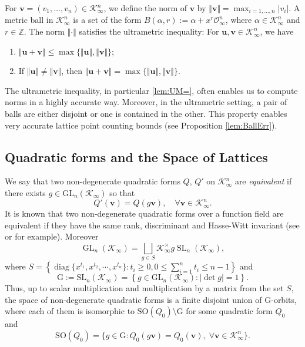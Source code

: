 \documentclass[11pt,a4paper,reqno]{amsart}
\newcommand{\GL}{\mathrm{GL}}
\newcommand{\SL}{\mathrm{SL}}
\newcommand{\SO}{{\mathrm{SO}}}
\theoremstyle{definition}
\theoremstyle{remark}
\numberwithin{equation}{section}
\begin{document}
 For $\mathbf{v}=(v_1,\dots,v_n)\in \mathcal{K}_{\infty}^n$, we define the norm of $\mathbf{v}$ by $\Vert \mathbf{v}\Vert=\max_{i=1,\dots,n}\vert v_i\vert$. A metric ball in $\mathcal K_\infty^n$ is a set of the form $B(\alpha,r):=\alpha+x^r\mathcal{O}_{\infty}^n$, where $\alpha\in \mathcal{K}_{\infty}^n$ and $r\in \mathbb Z$. The norm $\Vert \cdot \Vert$ satisfies the ultrametric inequality: For $\mathbf{u},\mathbf{v}\in \mathcal{K}_{\infty}^n$, we have
    \begin{enumerate}
        \item \label{lem:UM} $\Vert \mathbf{u}+\mathbf{v}\Vert\leq \max\{\Vert \mathbf{u}\Vert,\Vert\mathbf{v}\Vert\}$;
        \item \label{lem:UM=} If $\Vert \mathbf{u}\Vert\neq \Vert \mathbf{v}\Vert$, then $\Vert \mathbf{u}+\mathbf{v}\Vert=\max\{\Vert \mathbf{u}\Vert,\Vert \mathbf{v}\Vert\}$.
    \end{enumerate}

The ultrametric inequality, in particular \eqref{lem:UM=}, often enables us to compute norms in a highly accurate way. Moreover, in the ultrametric setting, a pair of balls are either disjoint or one is contained in the other. This property enables very accurate lattice point counting bounds (see Proposition \ref{lem:BallErr}). 

\subsection{Quadratic forms and the Space of Lattices} 
We say that two non-degenerate quadratic forms $Q$, $Q'$ on $\mathcal K_\infty^n$ are \emph{equivalent} if there exists $g\in \GL_n(\mathcal K_\infty)$ so that
\[
Q'(\mathbf{v})= Q(g\mathbf v),\quad \forall \mathbf v\in \mathcal K_\infty^n.
\] 
It is known that two non-degenerate quadratic forms over a function field are equivalent if they have the same rank, discriminant and Hasse-Witt invariant (see \cite[Remark 5.12]{EKM} or \cite[V.3.17]{Lam} for example). Moreover $$\operatorname{GL}_n(\mathcal{K}_{\infty})=\bigsqcup_{g\in S}\mathcal{K}_{\infty}^\times g \operatorname{SL}_n(\mathcal{K}_{\infty}),$$
where $S=\left\{\operatorname{diag}\{x^{t_1},x^{t_2},\cdots,x^{t_n}\}:t_i\geq 0,0\leq \sum_{i=1}^nt_i\leq n-1\right\}$ and $$\mathrm{G}:=\SL_n(\mathcal K_\infty)=\left\{g\in \GL_n(\mathcal K_\infty): |\det g|=1\right\}.$$
Thus, up to scalar multiplication and multiplication by a matrix from the set $S$, the space of non-degenerate quadratic forms is a finite disjoint union of $\mathrm{G}$-orbits, where each of them is isomorphic to $\SO(Q_0)\setminus \mathrm{G}$ for some quadratic form $Q_0$ and $$\SO(Q_0)=\{g\in \mathrm{G}: Q_0(g\mathbf v)=Q_0(\mathbf v),\;\forall \mathbf v\in \mathcal K_\infty^n\}.$$
\end{document}
